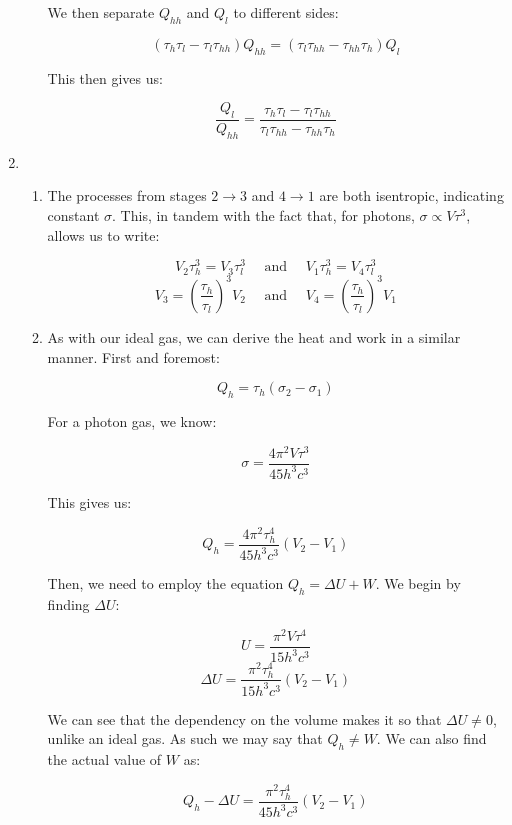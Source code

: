 \begin{enumerate}
\begin{enumerate}
        We then separate $Q_{hh}$ and $Q_l$ to different sides:

        $$(\tau_h\tau_l-\tau_l\tau_{hh})Q_{hh}=(\tau_l\tau_{hh}-\tau_{hh}\tau_h)Q_l$$

        This then gives us:

        $$\boxed{\frac{Q_l}{Q_{hh}}=\frac{\tau_h\tau_l-\tau_l\tau_{hh}}{\tau_l\tau_{hh}-\tau_{hh}\tau_h}}$$

    \end{enumerate}

  \item

    \begin{enumerate}

      \item 

        The processes from stages $2\to3$ and $4\to1$ are both isentropic, indicating constant $\sigma$. This, in tandem with the fact that, for photons, $\sigma\propto V\tau^3$, allows us to write:

        $$V_2\tau_h^3=V_3\tau_l^3\quad\text{ and }\quad V_1\tau_h^3=V_4\tau_l^3$$
        $$\boxed{V_3=\left( \frac{\tau_h}{\tau_l} \right)^3V_2\quad\text{ and }\quad V_4=\left( \frac{\tau_h}{\tau_l} \right)^3V_1}$$
        
      \item 

        As with our ideal gas, we can derive the heat and work in a similar manner. First and foremost:

        $$Q_h=\tau_h\left( \sigma_2-\sigma_1\right)$$

        For a photon gas, we know:

        $$\sigma=\frac{4\pi^2V\tau^3}{45h^3c^3}$$

        This gives us:

        $$Q_h=\frac{4\pi^2\tau_h^4}{45h^3c^3}(V_2-V_1)$$

        Then, we need to employ the equation $Q_h=\Delta U+W$. We begin by finding $\Delta U$:

        $$U=\frac{\pi^2V\tau^4}{15h^3c^3}$$
        $$\Delta U=\frac{\pi^2\tau_h^4}{15h^3c^3}(V_2-V_1)$$

        We can see that the dependency on the volume makes it so that $\Delta U\neq0$, unlike an ideal gas. As such we may say that $\boxed{Q_h\neq W}$. We can also find the actual value of $W$ as:

        $$Q_h-\Delta U=\frac{\pi^2\tau_h^4}{45h^3c^3}(V_2-V_1)$$


\end{enumerate}
\end{enumerate}
